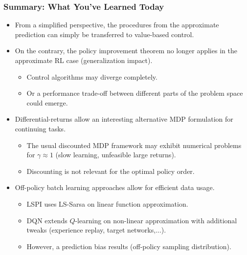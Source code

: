 \begin{frame}
\frametitle{Summary: What You've Learned Today}
\begin{itemize}
	\item From a simplified perspective, the procedures from the approximate prediction can simply be transferred to value-based control.\pause
	\item On the contrary, the policy improvement theorem no longer applies in the approximate RL case (generalization impact).\pause
	\begin{itemize}
		\item Control algorithms may diverge completely.\pause
		\item Or a performance trade-off between different parts of the problem space could emerge.\pause
	\end{itemize}
	\item Differential-returns allow an interesting alternative MDP formulation for continuing tasks.
		\begin{itemize}
		\item The usual discounted MDP framework may exhibit numerical problems for $\gamma\approx 1$ (slow learning, unfeasible large returns).\pause
		\item Discounting is not relevant for the optimal policy order.\pause
	\end{itemize}
	\item Off-policy batch learning approaches allow for efficient data usage.
	\begin{itemize}
		\item LSPI uses LS-Sarsa on linear function approximation.\pause
		\item DQN extends $Q$-learning on non-linear approximation with additional tweaks (experience replay, target networks,...).\pause
		\item However, a prediction bias results (off-policy sampling distribution).  
	\end{itemize}
\end{itemize}
\end{frame}

